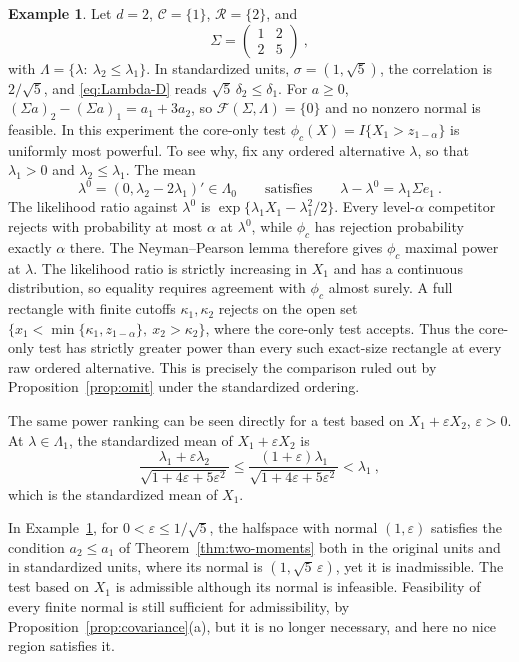 \documentclass[11pt]{article}
\newcommand{\red}[1]{{\color{red}#1}} %
\numberwithin{equation}{section}
\theoremstyle{definition}
\newtheorem{example}{Example}
\begin{document}
\begin{example}\label{ex:scale}
Let $d=2$, $\mathcal C=\{1\}$, $\mathcal R=\{2\}$, and
\[
\Sigma=\begin{pmatrix}1&2\\2&5\end{pmatrix}~,
\]
with $\Lambda=\{\lambda:\ \lambda_2\le\lambda_1\}$. In standardized units, $\sigma=(1,\sqrt5)$, the correlation is $2/\sqrt5$, and \eqref{eq:Lambda-D} reads $\sqrt5\,\delta_2\le \delta_1$. For $a\ge0$, $(\Sigma a)_2-(\Sigma a)_1=a_1+3a_2$, so $\mathcal F(\Sigma,\Lambda)=\{0\}$ \red{and no nonzero normal is feasible.} \red{In this experiment the core-only test $\phi_c(X)=I\{X_1>z_{1-\alpha}\}$ is uniformly most powerful. To see why, fix any ordered alternative $\lambda$, so that $\lambda_1>0$ and $\lambda_2\le\lambda_1$. The mean
\[
 \lambda^0=(0,\lambda_2-2\lambda_1)'\in\Lambda_0
 \qquad\text{satisfies}\qquad
 \lambda-\lambda^0=\lambda_1\Sigma e_1~.
\]
The likelihood ratio against $\lambda^0$ is $\exp\{\lambda_1X_1-\lambda_1^2/2\}$. Every level-$\alpha$ competitor rejects with probability at most $\alpha$ at $\lambda^0$, while $\phi_c$ has rejection probability exactly $\alpha$ there. The Neyman--Pearson lemma therefore gives $\phi_c$ maximal power at $\lambda$. The likelihood ratio is strictly increasing in $X_1$ and has a continuous distribution, so equality requires agreement with $\phi_c$ almost surely. A full rectangle with finite cutoffs $\kappa_1,\kappa_2$ rejects on the open set $\{x_1<\min\{\kappa_1,z_{1-\alpha}\},\ x_2>\kappa_2\}$, where the core-only test accepts. Thus the core-only test has strictly greater power than every such exact-size rectangle at every raw ordered alternative. This is precisely the comparison ruled out by Proposition~\ref{prop:omit} under the standardized ordering.}

\red{The same power ranking can be seen directly for a test based on $X_1+\varepsilon X_2$, $\varepsilon>0$.} At $\lambda\in\Lambda_1$, the standardized mean of $X_1+\varepsilon X_2$ is
\[
\frac{\lambda_1+\varepsilon\lambda_2}{\sqrt{1+4\varepsilon+5\varepsilon^2}}
\le\frac{(1+\varepsilon)\lambda_1}{\sqrt{1+4\varepsilon+5\varepsilon^2}}
<\lambda_1~,
\]
which is the standardized mean of $X_1$.
\end{example}

In Example~\ref{ex:scale}, for $0<\varepsilon\le1/\sqrt5$, the halfspace with normal $(1,\varepsilon)$ satisfies the condition $a_2\le a_1$ of Theorem~\ref{thm:two-moments} both in the original units and in standardized units, where its normal is $(1,\sqrt5\,\varepsilon)$, yet it is inadmissible. The test based on $X_1$ is admissible although its normal is infeasible. Feasibility of every finite normal is still sufficient for admissibility, by Proposition~\ref{prop:covariance}(a), but it is no longer necessary, and here no nice region satisfies it.
\end{document}
